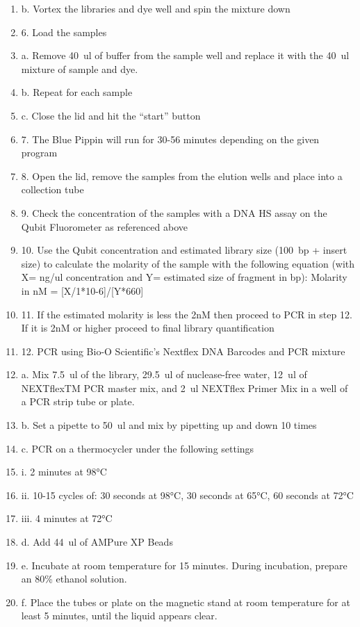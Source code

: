 \documentclass[graybox]{svmult}
\begin{document}
\begin{enumerate}
\item{b.      Vortex the libraries and dye well and spin the mixture down}
\item{6.      Load the samples}
\item{a.      Remove 40~ul of buffer from the sample well and replace it with the 40~ul mixture of sample and dye.}
\item{b.      Repeat for each sample}
\item{c.      Close the lid and hit the “start” button}
\item{7.      The Blue Pippin will run for 30-56 minutes depending on the given program}
\item{8.      Open the lid, remove the samples from the elution wells and place into a collection tube}
\item{9.      Check the concentration of the samples with a DNA HS assay on the Qubit Fluorometer as referenced above}
\item{10.      Use the Qubit concentration and estimated library size (100~bp + insert size) to calculate the molarity of the sample with the following equation (with X= ng/ul concentration and Y= estimated size of fragment in bp): Molarity in nM = [X/1*10-6]/[Y*660]}
\item{11.     If the estimated molarity is less the 2nM then proceed to PCR in step 12. If it is 2nM or higher proceed to final library quantification}
\item{12.     PCR using Bio-O Scientific’s Nextflex DNA Barcodes and PCR mixture}
\item{a.      Mix 7.5~ul of the library, 29.5~ul of nuclease-free water, 12~ul of NEXTflexTM PCR master mix, and 2~ul NEXTflex Primer Mix in a well of a PCR strip tube or plate.}
\item{b.      Set a pipette to 50~ul and mix by pipetting up and down 10 times}
\item{c.      PCR on a thermocycler under the following settings}
\item{i.      2 minutes at 98°C}
\item{ii.     10-15 cycles of: 30 seconds at 98°C, 30 seconds at 65°C, 60 seconds at 72°C}
\item{iii.    4 minutes at 72°C}
\item{d.      Add 44~ul of AMPure XP Beads}
\item{e.      Incubate at room temperature for 15 minutes. During incubation, prepare an 80\% ethanol solution.}
\item{f.      Place the tubes or plate on the magnetic stand at room temperature for at least 5 minutes, until the liquid appears clear.}

\end{enumerate}
\end{document}
